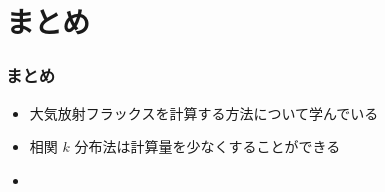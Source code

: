 \documentclass[unicode,colorlinks]{beamer}
\begin{document}
% 

\section{まとめ}

\begin{frame}
	\frametitle{まとめ}
	\begin{itemize}
		\item 大気放射フラックスを計算する方法について学んでいる
		\item 相関 $k$ 分布法は計算量を少なくすることができる
		\item 
	\end{itemize}
\end{frame}
\end{document}

